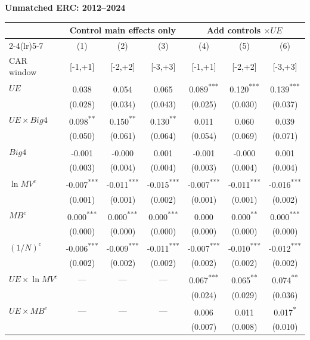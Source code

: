 \documentclass[10pt]{article}
\newcommand{\sym}[1]{\textsuperscript{#1}}
\begin{document}
\noindent\textbf{Unmatched ERC: 2012--2024}\par\medskip
\setlength{\tabcolsep}{4pt}\renewcommand{\arraystretch}{1.12}
\noindent\begin{tabular*}{\textwidth}{@{\extracolsep{\fill}}lcccccc@{}}\toprule
 & \multicolumn{3}{c}{Control main effects only} & \multicolumn{3}{c}{Add controls \(\times UE\)} \\
\cmidrule(lr){2-4}\cmidrule(lr){5-7}
 & (1) & (2) & (3) & (4) & (5) & (6) \\
CAR window & [-1,+1] & [-2,+2] & [-3,+3] & [-1,+1] & [-2,+2] & [-3,+3] \\\midrule
\(UE\) & 0.038\sym{} & 0.054\sym{} & 0.065\sym{} & 0.089\sym{***} & 0.120\sym{***} & 0.139\sym{***} \\
 & (0.028) & (0.034) & (0.043) & (0.025) & (0.030) & (0.037) \\
\(UE\times Big4\) & 0.098\sym{**} & 0.150\sym{**} & 0.130\sym{**} & 0.011\sym{} & 0.060\sym{} & 0.039\sym{} \\
 & (0.050) & (0.061) & (0.064) & (0.054) & (0.069) & (0.071) \\
\(Big4\) & -0.001\sym{} & -0.000\sym{} & 0.001\sym{} & -0.001\sym{} & -0.000\sym{} & 0.001\sym{} \\
 & (0.003) & (0.004) & (0.004) & (0.003) & (0.004) & (0.004) \\
\(\ln MV^c\) & -0.007\sym{***} & -0.011\sym{***} & -0.015\sym{***} & -0.007\sym{***} & -0.011\sym{***} & -0.016\sym{***} \\
 & (0.001) & (0.001) & (0.002) & (0.001) & (0.001) & (0.002) \\
\(MB^c\) & 0.000\sym{***} & 0.000\sym{***} & 0.000\sym{***} & 0.000\sym{} & 0.000\sym{**} & 0.000\sym{***} \\
 & (0.000) & (0.000) & (0.000) & (0.000) & (0.000) & (0.000) \\
\((1/N)^c\) & -0.006\sym{***} & -0.009\sym{***} & -0.011\sym{***} & -0.007\sym{***} & -0.010\sym{***} & -0.012\sym{***} \\
 & (0.002) & (0.002) & (0.002) & (0.002) & (0.002) & (0.002) \\
\(UE\times\ln MV^c\) & --- & --- & --- & 0.067\sym{***} & 0.065\sym{**} & 0.074\sym{**} \\
 &  &  &  & (0.024) & (0.029) & (0.036) \\
\(UE\times MB^c\) & --- & --- & --- & 0.006\sym{} & 0.011\sym{} & 0.017\sym{*} \\
 &  &  &  & (0.007) & (0.008) & (0.010) \\

\end{tabular*}
\end{document}
